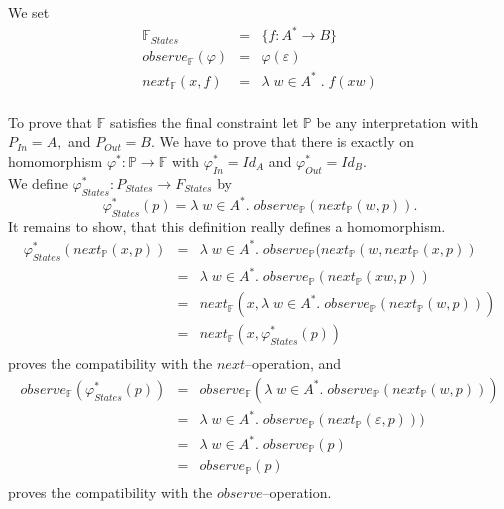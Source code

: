 \documentclass[landscape, autoslides, light]{mmiss}
\begin{document}
\begin{Package}[Label={FSDPT}, Title={Formal Specification of Data and Process Types}, ShortTitle={FSDPT}, Authors={Horst Reichel}, Date={February 2003}, LevelOfDetail=Lecture, Language=en-GB]
\begin{Section}[Title={Final Coalgebras as Process Types}, Label={section4}]
\begin{Section}[Title={Examples of Process Types}, Label={section4_2}]
\begin{Paragraph}[Label=Paragraph99]
We set $$\begin{array}{lll} \mathbb{F}_{States} & = & \{f : A^*
\to B \} \\ observe_{\mathbb{F}}(\varphi) &= &
\varphi(\varepsilon) \\ next_{\mathbb{F}}(x,f) & = & \lambda \; w
\in A^* \; . \; f(xw)\\ \end{array}$$

\end{Paragraph}
\begin{Paragraph}[Label=Paragraph100]

To prove that $ \mathbb{F}$ satisfies the final constraint let
$\mathbb{P}$ be any interpretation with $P_{In} = A,$ and $P_{Out}
= B$. \pause We have to prove that there is exactly on
homomorphism $\varphi^* : \mathbb{P} \to \mathbb{F}$ with
$\varphi^*_{In} = Id_A$ and $\varphi^*_{Out} = Id_B$. \\ \pause We
define $\varphi^*_{States} : P_{States} \to F_{States}$ by
$$\varphi^*_{States}(p) = \lambda \; w \in A^* . \;
observe_{\mathbb{P}}(next_{\mathbb{P}}(w,p)).$$ \pause It remains
to show, that this definition really defines a homomorphism.\pause
$$\begin{array}{lll}
\varphi^*_{States}(next_{\mathbb{P}}(x,p)) & = & \lambda \; w \in
A^* . \; observe_{\mathbb{P}}(next_{\mathbb{P}}(w,
next_{\mathbb{P}}(x,p)) \\
 & = & \lambda \; w \in A^* . \;
 observe_{\mathbb{P}}(next_{\mathbb{P}}(xw,p)) \\
 & = & next_{\mathbb{F}}(x, \lambda \; w \in A^* . \;
 observe_{\mathbb{P}}(next_{\mathbb{P}}(w,p))) \\
  & = & next_{\mathbb{F}}(x, \varphi^*_{States}(p))\\
  \end{array}$$
  proves the compatibility with the $next$--operation, and
$$\begin{array}{lll}
observe_{\mathbb{F}}(\varphi^*_{States}(p)) & = &
observe_{\mathbb{F}}(\lambda \; w \in A^* . \;
observe_{\mathbb{P}}(next_{\mathbb{P}}(w,p))) \\
 & = & \lambda \; w \in A^* . \;
observe_{\mathbb{P}}(next_{\mathbb{P}}( \varepsilon,p)))\\
 & = & \lambda \; w \in A^* . \; observe_{\mathbb{P}}(p) \\
 & = & observe_{\mathbb{P}}(p) \\  \end{array}$$
 proves the compatibility with the $observe$--operation.\pause


\end{Paragraph}
\end{Section}
\end{Section}
\end{Package}
\end{document}

